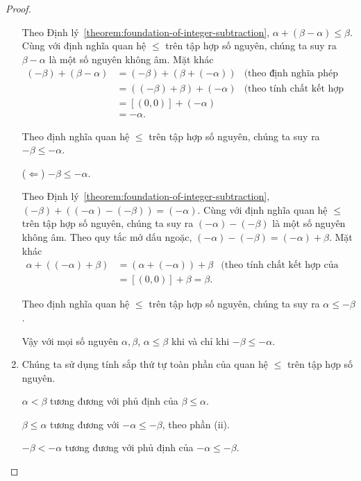 \begin{proof}
\begin{enumerate}[label={(\roman*)}]
		      Theo Định lý~\ref{theorem:foundation-of-integer-subtraction}, $\alpha + (\beta - \alpha)\leq\beta$. Cùng với định nghĩa quan hệ $\leq$ trên tập hợp số nguyên, chúng ta suy ra $\beta - \alpha$ là một số nguyên không âm. Mặt khác
		      \begin{align*}
			      (-\beta) + (\beta - \alpha) & = (-\beta) + (\beta + (-\alpha)) & \text{(theo định nghĩa phép trừ hai số nguyên)}         \\
			                                  & = ((-\beta) + \beta) + (-\alpha) & \text{(theo tính chất kết hợp của phép cộng số nguyên)} \\
			                                  & = [(0,0)] + (-\alpha)                                                                      \\
			                                  & = -\alpha.
		      \end{align*}

		      Theo định nghĩa quan hệ $\leq$ trên tập hợp số nguyên, chúng ta suy ra $-\beta\leq -\alpha$.

		      ($\Leftarrow$) $-\beta\leq -\alpha$.

		      Theo Định lý~\ref{theorem:foundation-of-integer-subtraction}, $(-\beta) + ((-\alpha) - (-\beta)) = (-\alpha)$. Cùng với định nghĩa quan hệ $\leq$ trên tập hợp số nguyên, chúng ta suy ra $(-\alpha) -(-\beta)$ là một số nguyên không âm. Theo quy tắc mở dấu ngoặc, $(-\alpha) - (-\beta) = (-\alpha) + \beta$. Mặt khác
		      \begin{align*}
			      \alpha + ((-\alpha) + \beta) & = (\alpha + (-\alpha)) + \beta & \text{(theo tính chất kết hợp của phép cộng hai số nguyên)} \\
			                                   & = [(0,0)] + \beta = \beta.
		      \end{align*}

		      Theo định nghĩa quan hệ $\leq$ trên tập hợp số nguyên, chúng ta suy ra $\alpha\leq -\beta$.

		      Vậy với mọi số nguyên $\alpha, \beta$, $\alpha\leq \beta$ khi và chỉ khi $-\beta\leq-\alpha$.
		\item Chúng ta sử dụng tính sắp thứ tự toàn phần của quan hệ $\leq$ trên tập hợp số nguyên.

		      $\alpha < \beta$ tương đương với phủ định của $\beta\leq\alpha$.

		      $\beta\leq\alpha$ tương đương với $-\alpha\leq-\beta$, theo phần (ii).

		      $-\beta < -\alpha$ tương đương với phủ định của $-\alpha\leq-\beta$.


\end{enumerate}
\end{proof}
